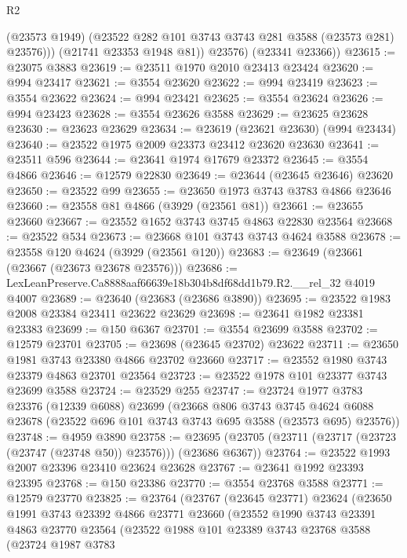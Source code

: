 \begin{lexlean}{R2}
\begin{coremodule}
              (@23573 @1949)
              (@23522 @282 @101 @3743 @3743 @281 @3588 (@23573 @281) @23576)))
          (@21741 @23353 @1948 @81))
        @23576)
      (@23341 @23366))
@23615 := @23075 @3883
@23619 := @23511 @1970 @2010 @23413 @23424
@23620 := @994 @23417
@23621 := @3554 @23620
@23622 := @994 @23419
@23623 := @3554 @23622
@23624 := @994 @23421
@23625 := @3554 @23624
@23626 := @994 @23423
@23628 := @3554 @23626 @3588
@23629 := @23625 @23628
@23630 := @23623 @23629
@23634 := @23619 (@23621 @23630) (@994 @23434)
@23640 := @23522 @1975 @2009 @23373 @23412 @23620 @23630
@23641 := @23511 @596
@23644 := @23641 @1974 @17679 @23372
@23645 := @3554 @4866
@23646 := @12579 @22830
@23649 := @23644 (@23645 @23646) @23620
@23650 := @23522 @99
@23655 := @23650 @1973 @3743 @3783 @4866 @23646
@23660 := @23558 @81 @4866 (@3929 (@23561 @81))
@23661 := @23655 @23660
@23667 := @23552 @1652 @3743 @3745 @4863 @22830 @23564
@23668 := @23522 @534
@23673 := @23668 @101 @3743 @3743 @4624 @3588
@23678 := @23558 @120 @4624 (@3929 (@23561 @120))
@23683 := @23649 (@23661 (@23667 (@23673 @23678 @23576)))
@23686 := LexLeanPreserve.Ca8888aaf66639e18b304b8df68dd1b79.R2.__rel_32 @4019 @4007
@23689 := @23640 (@23683 (@23686 @3890))
@23695 := @23522 @1983 @2008 @23384 @23411 @23622 @23629
@23698 := @23641 @1982 @23381 @23383
@23699 := @150 @6367
@23701 := @3554 @23699 @3588
@23702 := @12579 @23701
@23705 := @23698 (@23645 @23702) @23622
@23711 := @23650 @1981 @3743 @23380 @4866 @23702 @23660
@23717 := @23552 @1980 @3743 @23379 @4863 @23701 @23564
@23723 := @23522 @1978 @101 @23377 @3743 @23699 @3588
@23724 := @23529 @255
@23747 := @23724
    @1977
    @3783
    @23376
    (@12339 @6088)
    @23699
    (@23668
      @806
      @3743
      @3745
      @4624
      @6088
      @23678
      (@23522 @696 @101 @3743 @3743 @695 @3588 (@23573 @695) @23576))
@23748 := @4959 @3890
@23758 := @23695 (@23705 (@23711 (@23717 (@23723 (@23747 (@23748 @50)) @23576))) (@23686 @6367))
@23764 := @23522 @1993 @2007 @23396 @23410 @23624 @23628
@23767 := @23641 @1992 @23393 @23395
@23768 := @150 @23386
@23770 := @3554 @23768 @3588
@23771 := @12579 @23770
@23825 := @23764
    (@23767
      (@23645 @23771)
      @23624
      (@23650
        @1991
        @3743
        @23392
        @4866
        @23771
        @23660
        (@23552
          @1990
          @3743
          @23391
          @4863
          @23770
          @23564
          (@23522
            @1988
            @101
            @23389
            @3743
            @23768
            @3588
            (@23724
              @1987
              @3783

\end{coremodule}
\end{lexlean}
